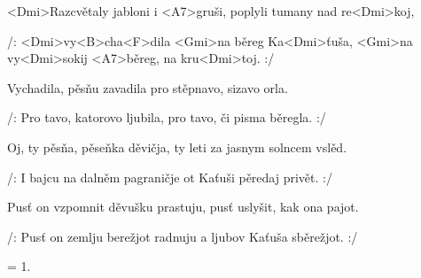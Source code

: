 


\zs



<Dmi>Razcvětaly jabloni i <A7>gruši, poplyli tumany nad 
re<Dmi>koj,

/: <Dmi>vy<B>cha<F>dila <Gmi>na běreg Ka<Dmi>ťuša, 
<Gmi>na vy<Dmi>sokij <A7>běreg, na kru<Dmi>toj. :/
\ks

\zs


Vychadila, pěsňu zavadila pro stěpnavo, sizavo orla.

/: Pro tavo, katorovo ljubila, pro tavo, či pisma běregla. :/
\ks

\zs


Oj, ty pěsňa, pěseňka děvičja, ty leti za jasnym solncem vslěd.

/: I bajcu na dalněm pagraničje ot Kaťuši pěredaj privět. :/
\ks

\zs


Pusť on vzpomnit děvušku prastuju, pusť uslyšit, kak ona pajot.

/: Pusť on zemlju berežjot radnuju a ljubov Kaťuša sběrežjot. :/
\ks

\zs
= 1.
\ks

\kp
